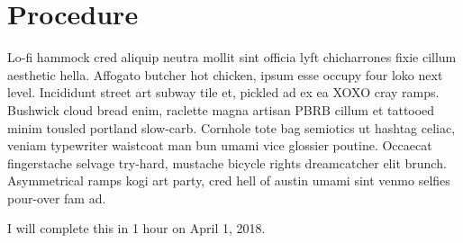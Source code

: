 
\section{Procedure}
\label{sec:procedure}

Lo-fi hammock cred aliquip neutra mollit sint officia lyft chicharrones fixie cillum
aesthetic hella. Affogato butcher hot chicken, ipsum esse occupy four loko next level.
Incididunt street art subway tile et, pickled ad ex ea XOXO cray ramps. Bushwick cloud bread
enim, raclette magna artisan PBRB cillum et tattooed minim tousled portland slow-carb.
Cornhole tote bag semiotics ut hashtag celiac, veniam typewriter waistcoat man bun umami
vice glossier poutine. Occaecat fingerstache selvage try-hard, mustache bicycle rights
dreamcatcher elit brunch. Asymmetrical ramps kogi art party, cred hell of austin umami sint
venmo selfies pour-over fam ad.

\mytimeline I will complete this in 1 hour on April 1, 2018.
